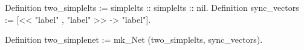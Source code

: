Definition two_simplelts := simplelts :: simplelts :: nil.
Definition sync_vectors :=
  [<< "label" , "label" >> -> "label"].

Definition two_simplenet := mk_Net (two_simplelts, sync_vectors).